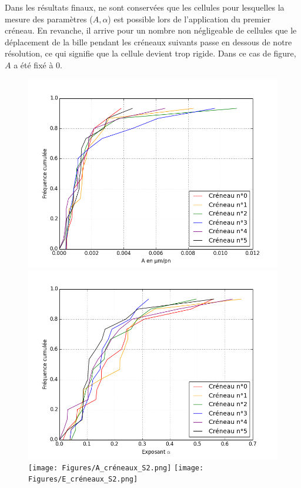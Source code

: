 \documentclass{report}
\begin{document}
Dans les résultats finaux, ne sont conservées que les cellules pour lesquelles la mesure des paramètres ($A, \alpha$) est possible lors de l'application du premier créneau. 
En revanche, il arrive pour un nombre non négligeable de cellules que le déplacement de la bille pendant les créneaux suivants passe en dessous de notre résolution, ce qui signifie que la cellule devient trop rigide. Dans ce cas de figure, $A$ a été fixé à 0. 

\begin{figure}
\includegraphics[scale=0.3]{Figures/A_créneaux_témoin.png}
\includegraphics[scale=0.3]{Figures/E_créneaux_témoin.png} 
\\
\texttt{[image: Figures/A\_créneaux\_S2.png]} 
\texttt{[image: Figures/E\_créneaux\_S2.png]} 
\caption{\label{Evolution_6c}} 
\end{figure}
\end{document}
